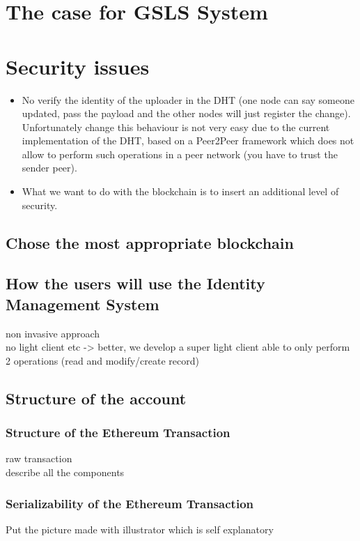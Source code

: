 \section{The case for GSLS System}
\label{S:3}

\section{Security issues}
\begin{itemize}
  \item No verify the identity of the uploader in the DHT (one node can say someone updated, pass the payload and the other nodes will just register the change). Unfortunately change this behaviour is not very easy due to the current implementation of the DHT, based on a Peer2Peer framework which does not allow to perform such operations in a peer network (you have to trust the sender peer).
  \item What we want to do with the blockchain is to insert an additional level of security.
\end{itemize}



\subsection{Chose the most appropriate blockchain}



\subsection{How the users will use the Identity Management System}
non invasive approach\\
no light client etc -> better, we develop a super light client able to only perform 2 operations (read and modify/create record)


\subsection{Structure of the account}

\subsubsection{Structure of the Ethereum Transaction}

raw transaction\\

describe all the components

\subsubsection{Serializability of the Ethereum Transaction}

Put the picture made with illustrator which is self explanatory